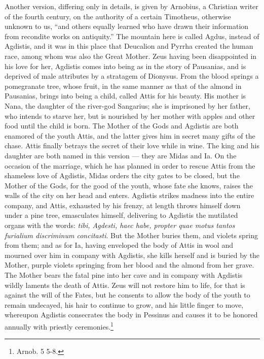 \documentclass[a4paper, 11pt, oneside, polutonikogreek, french]{article}
\begin{document}
Another version, differing only in details, is given by Arnobius, a Christian writer of the fourth century, on the authority of a certain Timotheus, otherwise unknown to us, ``and others equally learned who have drawn their information from recondite works on antiquity.'' The mountain here is called Agdus, instead of Agdistis, and it was in this place that Deucalion and Pyrrha created the human race, among whom was also the Great Mother. Zeus having been disappointed in his love for her, Agdistis comes into being as in the story of Pausanias, and is deprived of male attributes by a stratagem of Dionysus. From the blood springs a pomegranate tree, whose fruit, in the same manner as that of the almond in Pausanias, brings into being a child, called Attis for his beauty. His mother is Nana, the daughter of the river-god Sangarius; she is imprisoned by her father, who intends to starve her, but is nourished by her mother with apples and other food until the child is born. The Mother of the Gods and Agdistis are both enamored of the youth Attis, and the latter gives him in secret many gifts of the chase. Attis finally betrays the secret of their love while in wine. The king and his daughter are both named in this version --- they are Midas and Ia. On the occasion of the marriage, which he has planned in order to rescue Attis from the shameless love of Agdistis, Midas orders the city gates to be closed, but the Mother of the Gods, for the good of the youth, whose fate she knows, raises the walls of the city on her head and enters. Agdistis strikes madness into the entire company, and Attis, exhausted by his frenzy, at length throws himself down under a pine tree, emasculates himself, delivering to Agdistis the mutilated organs with the words: \emph{tibi, Agdesti, haec habe, propter quae motus tantos furialium discriminum concitasti}. But the Mother buries them, and violets spring from them; and as for Ia, having enveloped the body of Attis in wool and mourned over him in company with Agdistis, she kills herself and is buried by the Mother, purple violets springing from her blood and the almond from her grave. The Mother bears the fatal pine into her cave and in company with Agdistis wildly laments the death of Attis. Zeus will not restore him to life, for that is against the will of the Fates, but he consents to allow the body of the youth to remain undecayed, his hair to continue to grow, and his little finger to move, whereupon Agdistis consecrates the body in Pessinus and causes it to be honored annually with priestly ceremonies.\footnote{Arnob. 5 5-8.}
\end{document}

